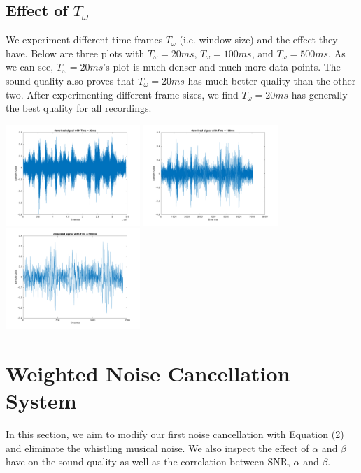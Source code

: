 \documentclass[journal]{IEEEtran}
\begin{document}
\subsection{Effect of $T_\omega$}
\begin{flushleft}
We experiment different time frames $T_\omega$ (i.e. window size) and the effect they have. Below are three plots with $T_\omega = 20ms$, $T_\omega = 100ms$, and $T_\omega = 500ms$. As we can see, $T_\omega = 20ms$'s plot is much denser and much more data points. The sound quality also proves that $T_\omega = 20ms$ has much better quality than the other two. After experimenting different frame sizes, we find $T_\omega = 20ms$ has generally the best quality for all recordings. 
\end{flushleft}
\centering 
\includegraphics[width=2in]{20ms}
\centering 
\includegraphics[width=2in]{100ms}
\centering 
\includegraphics[width=2in]{500ms}

\section{Weighted Noise Cancellation System}
\begin{flushleft}
In this section, we aim to modify our first noise cancellation with Equation (2) and eliminate the whistling musical noise. We also inspect the effect of $\alpha$ and $\beta$ have on the sound quality as well as the correlation between SNR, $\alpha$ and $\beta$.
\end{flushleft}
\end{document}
